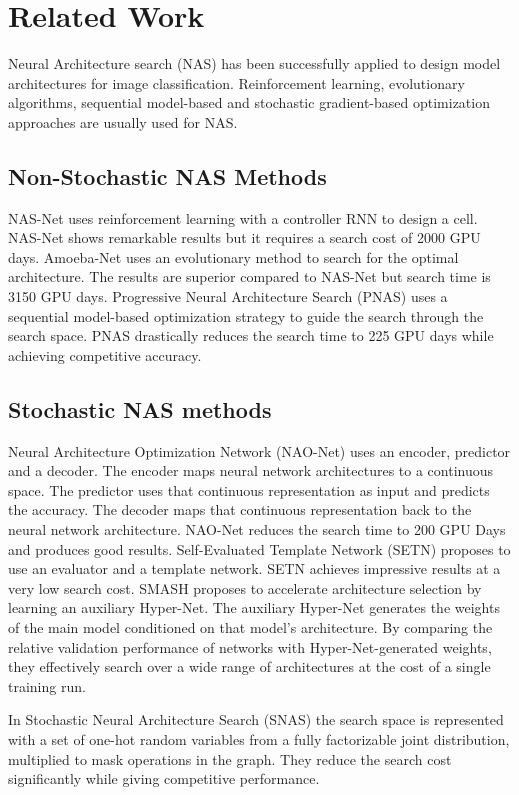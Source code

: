 \documentclass[10pt,a4paper,conference]{IEEEtran}
\begin{document}
\section{Related Work}
Neural Architecture search (NAS) has been successfully applied to design model architectures for image classification. Reinforcement learning, evolutionary algorithms, sequential model-based and stochastic gradient-based optimization approaches are usually used for NAS.
\subsection {Non-Stochastic NAS Methods}
NAS-Net \cite{zoph2018learning:1} uses reinforcement learning with a controller RNN to design a cell. NAS-Net shows remarkable results but it requires a search cost of 2000 GPU days. Amoeba-Net \cite{RealAggarwalHuangLe2018:5} uses an evolutionary method to search for the optimal architecture. The results are superior compared to NAS-Net but search time is 3150 GPU days. Progressive Neural Architecture Search (PNAS) \cite{Liu_2018:4} uses a sequential model-based optimization strategy to guide the search through the search space. PNAS drastically reduces the search time to 225 GPU days while achieving competitive accuracy.
\subsection{Stochastic NAS methods}
 Neural Architecture Optimization Network (NAO-Net) \cite{luo2018neural:9} uses an encoder, predictor and a decoder. The encoder maps neural network architectures to a continuous space. The predictor uses that continuous representation as input and predicts the accuracy. The decoder maps that continuous representation back to the neural network architecture. NAO-Net reduces the search time to 200 GPU Days and produces good results.
 Self-Evaluated Template Network (SETN) \cite{dong2019one:12} proposes to use an evaluator and a template network. SETN achieves impressive results at a very low search cost. SMASH \cite{brock2017smash:10} proposes to accelerate architecture selection by learning an auxiliary Hyper-Net. The auxiliary Hyper-Net generates the weights of the main model conditioned on that model’s architecture. By comparing the relative validation performance of networks with Hyper-Net-generated weights, they effectively search over a wide range of architectures at the cost of a single training run. 

In Stochastic Neural Architecture Search (SNAS) \cite{xie2018snas:4} the search space is represented with a set of one-hot random variables from a fully factorizable joint distribution, multiplied to mask operations in the graph. They reduce the search cost significantly while giving competitive performance. 
\end{document}
